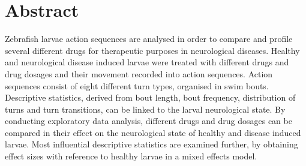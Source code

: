 \documentclass[a4paper,12pt]{article}
\begin{document}
\section*{Abstract}
Zebrafish larvae action sequences are analysed in order to compare and profile several different drugs for therapeutic purposes in neurological diseases. Healthy and neurological disease induced larvae were treated with different drugs and drug dosages and their movement recorded into action sequences. Action sequences consist of eight different turn types, organised in swim bouts. Descriptive statistics, derived from bout length, bout frequency, distribution of turns and turn transitions, can be linked to the larval neurological state. By conducting exploratory data analysis, different drugs and drug dosages can be compared in their effect on the neurological state of healthy and disease induced larvae. Most influential descriptive statistics are examined further, by obtaining effect sizes with reference to healthy larvae in a mixed effects model.
\phantom{p}
\vfill

\newpage

\tableofcontents
\listoffigures 
\listoftables

\newpage
\end{document}
